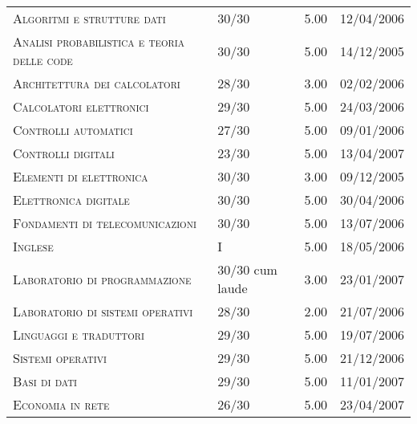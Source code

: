 \begin{tabular}{p{8cm}lll}
\textsc{Algoritmi e strutture dati}                             &  30/30             &  5.00           &     12/04/2006       \\
\textsc{Analisi probabilistica e teoria delle code}             &  30/30             &  5.00           &     14/12/2005       \\
\textsc{Architettura dei calcolatori}                           &  28/30             &  3.00           &     02/02/2006       \\
\textsc{Calcolatori elettronici}                                &  29/30             &  5.00           &     24/03/2006       \\
\textsc{Controlli automatici}                                   &  27/30             &  5.00           &     09/01/2006       \\
\textsc{Controlli digitali}                                     &  23/30             &  5.00           &     13/04/2007       \\
\textsc{Elementi di elettronica}                                &  30/30             &  3.00           &     09/12/2005       \\
\textsc{Elettronica digitale}                                   &  30/30             &  5.00           &     30/04/2006       \\
\textsc{Fondamenti di telecomunicazioni}                        &  30/30             &  5.00           &     13/07/2006       \\
\textsc{Inglese}                                                &  I                 &  5.00           &     18/05/2006       \\
\textsc{Laboratorio di programmazione}                          &  30/30 cum laude   &  3.00           &     23/01/2007       \\
\textsc{Laboratorio di sistemi operativi}                       &  28/30             &  2.00           &     21/07/2006       \\
\textsc{Linguaggi e traduttori}                                 &  29/30             &  5.00           &     19/07/2006       \\
\textsc{Sistemi operativi}                                      &  29/30             &  5.00           &     21/12/2006       \\
\textsc{Basi di dati}                                           &  29/30             &  5.00           &     11/01/2007       \\
\textsc{Economia in rete}                                       &  26/30             &  5.00           &     23/04/2007       \\

\end{tabular}
